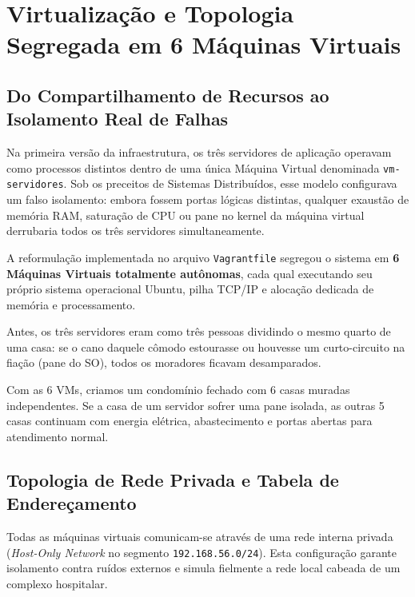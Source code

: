 \documentclass[11pt,a4paper]{article}
\begin{document}
\section{Virtualização e Topologia Segregada em 6 Máquinas Virtuais}

\subsection{Do Compartilhamento de Recursos ao Isolamento Real de Falhas}

Na primeira versão da infraestrutura, os três servidores de aplicação operavam como processos distintos dentro de uma única Máquina Virtual denominada \texttt{vm-servidores}. Sob os preceitos de Sistemas Distribuídos, esse modelo configurava um falso isolamento: embora fossem portas lógicas distintas, qualquer exaustão de memória RAM, saturação de CPU ou pane no kernel da máquina virtual derrubaria todos os três servidores simultaneamente.

A reformulação implementada no arquivo \texttt{Vagrantfile} segregou o sistema em \textbf{6 Máquinas Virtuais totalmente autônomas}, cada qual executando seu próprio sistema operacional Ubuntu, pilha TCP/IP e alocação dedicada de memória e processamento.

\begin{analogia}
Antes, os três servidores eram como três pessoas dividindo o mesmo quarto de uma casa: se o cano daquele cômodo estourasse ou houvesse um curto-circuito na fiação (pane do SO), todos os moradores ficavam desamparados. 

Com as 6 VMs, criamos um condomínio fechado com 6 casas muradas independentes. Se a casa de um servidor sofrer uma pane isolada, as outras 5 casas continuam com energia elétrica, abastecimento e portas abertas para atendimento normal.
\end{analogia}

\subsection{Topologia de Rede Privada e Tabela de Endereçamento}

Todas as máquinas virtuais comunicam-se através de uma rede interna privada (\textit{Host-Only Network} no segmento \texttt{192.168.56.0/24}). Esta configuração garante isolamento contra ruídos externos e simula fielmente a rede local cabeada de um complexo hospitalar.
\end{document}
